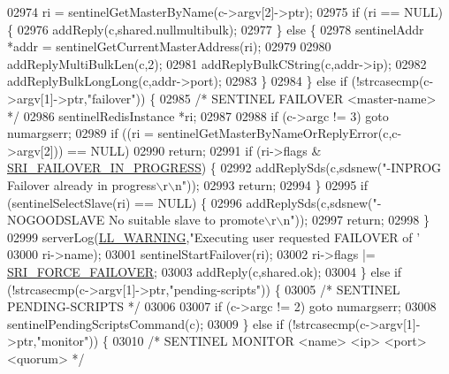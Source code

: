 \begin{DoxyCode}
{{{{{{{{{{{{{{{{{{{{{{{{{{{{{{{{{{{{{{{{{{{{{{{{{{{{{{{{{02974         ri = sentinelGetMasterByName(c->argv[2]->ptr);
02975         \textcolor{keywordflow}{if} (ri == NULL) \{
02976             addReply(c,shared.nullmultibulk);
02977         \} \textcolor{keywordflow}{else} \{
02978             sentinelAddr *addr = sentinelGetCurrentMasterAddress(ri);
02979 
02980             addReplyMultiBulkLen(c,2);
02981             addReplyBulkCString(c,addr->ip);
02982             addReplyBulkLongLong(c,addr->port);
02983         \}
02984     \} \textcolor{keywordflow}{else} \textcolor{keywordflow}{if} (!strcasecmp(c->argv[1]->ptr,\textcolor{stringliteral}{"failover"})) \{
02985         \textcolor{comment}{/* SENTINEL FAILOVER <master-name> */}
02986         sentinelRedisInstance *ri;
02987 
02988         \textcolor{keywordflow}{if} (c->argc != 3) \textcolor{keywordflow}{goto} numargserr;
02989         \textcolor{keywordflow}{if} ((ri = sentinelGetMasterByNameOrReplyError(c,c->argv[2])) == NULL)
02990             \textcolor{keywordflow}{return};
02991         \textcolor{keywordflow}{if} (ri->flags & \hyperlink{sentinel_8c_a0546b63633196f09fcd90957243b0798}{SRI\_FAILOVER\_IN\_PROGRESS}) \{
02992             addReplySds(c,sdsnew(\textcolor{stringliteral}{"-INPROG Failover already in progress\(\backslash\)r\(\backslash\)n"}));
02993             \textcolor{keywordflow}{return};
02994         \}
02995         \textcolor{keywordflow}{if} (sentinelSelectSlave(ri) == NULL) \{
02996             addReplySds(c,sdsnew(\textcolor{stringliteral}{"-NOGOODSLAVE No suitable slave to promote\(\backslash\)r\(\backslash\)n"}));
02997             \textcolor{keywordflow}{return};
02998         \}
02999         serverLog(\hyperlink{server_8h_a31229b9334bba7d6be2a72970967a14b}{LL\_WARNING},\textcolor{stringliteral}{"Executing user requested FAILOVER of '%
03000             ri->name);
03001         sentinelStartFailover(ri);
03002         ri->flags |= \hyperlink{sentinel_8c_a9b13a255852e8097e4730cb495cdfd94}{SRI\_FORCE\_FAILOVER};
03003         addReply(c,shared.ok);
03004     \} \textcolor{keywordflow}{else} \textcolor{keywordflow}{if} (!strcasecmp(c->argv[1]->ptr,\textcolor{stringliteral}{"pending-scripts"})) \{
03005         \textcolor{comment}{/* SENTINEL PENDING-SCRIPTS */}
03006 
03007         \textcolor{keywordflow}{if} (c->argc != 2) \textcolor{keywordflow}{goto} numargserr;
03008         sentinelPendingScriptsCommand(c);
03009     \} \textcolor{keywordflow}{else} \textcolor{keywordflow}{if} (!strcasecmp(c->argv[1]->ptr,\textcolor{stringliteral}{"monitor"})) \{
03010         \textcolor{comment}{/* SENTINEL MONITOR <name> <ip> <port> <quorum> */}
}}}}}}}}}}}}}}}}}}}}}}}}}}}}}}}}}}}}}}}}}}}}}}}}}}}}}}}}}}
\end{DoxyCode}
